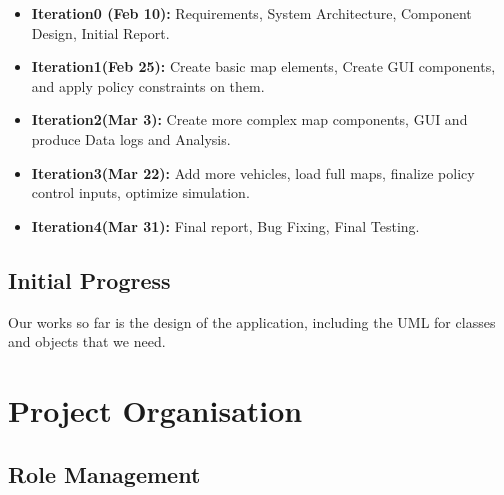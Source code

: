 \documentclass[11pt]{article}
\begin{document}
\begin{itemize}
\item
\textbf{Iteration0 (Feb 10):} Requirements, System Architecture, Component Design, Initial Report.
 \item \textbf{Iteration1(Feb 25):}  Create basic map elements, Create GUI components, and apply policy constraints on them.
 \item \textbf{Iteration2(Mar 3):} Create more complex map components, GUI and produce Data logs and Analysis.
 \item \textbf{Iteration3(Mar 22):} Add more vehicles, load full maps, finalize policy control inputs, optimize simulation.
 \item \textbf{Iteration4(Mar 31):} Final report, Bug Fixing, Final Testing.


\end{itemize}
	
\subsection{Initial Progress}
Our works so far is the design of the application, including the UML for classes and objects that we need. 

\section{Project Organisation}

\subsection{Role Management}
\end{document}
